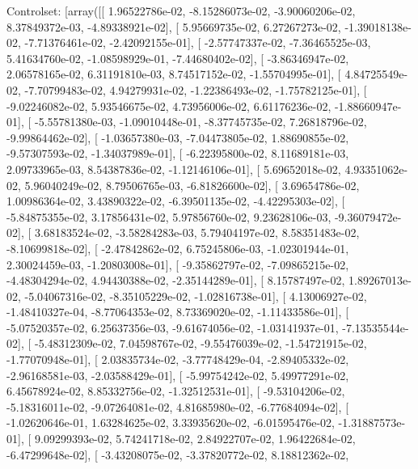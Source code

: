 \documentclass{article}
\begin{document}
Controlset: [array([[  1.96522786e-02,  -8.15286073e-02,  -3.90060206e-02,
          8.37849372e-03,  -4.89338921e-02],
       [  5.95669735e-02,   6.27267273e-02,  -1.39018138e-02,
         -7.71376461e-02,  -2.42092155e-01],
       [ -2.57747337e-02,  -7.36465525e-03,   5.41634760e-02,
         -1.08598929e-01,  -7.44680402e-02],
       [ -3.86346947e-02,   2.06578165e-02,   6.31191810e-03,
          8.74517152e-02,  -1.55704995e-01],
       [  4.84725549e-02,  -7.70799483e-02,   4.94279931e-02,
         -1.22386493e-02,  -1.75782125e-01],
       [ -9.02246082e-02,   5.93546675e-02,   4.73956006e-02,
          6.61176236e-02,  -1.88660947e-01],
       [ -5.55781380e-03,  -1.09010448e-01,  -8.37745735e-02,
          7.26818796e-02,  -9.99864462e-02],
       [ -1.03657380e-03,  -7.04473805e-02,   1.88690855e-02,
         -9.57307593e-02,  -1.34037989e-01],
       [ -6.22395800e-02,   8.11689181e-03,   2.09733965e-03,
          8.54387836e-02,  -1.12146106e-01],
       [  5.69652018e-02,   4.93351062e-02,   5.96040249e-02,
          8.79506765e-03,  -6.81826600e-02],
       [  3.69654786e-02,   1.00986364e-02,   3.43890322e-02,
         -6.39501135e-02,  -4.42295303e-02],
       [ -5.84875355e-02,   3.17856431e-02,   5.97856760e-02,
          9.23628106e-03,  -9.36079472e-02],
       [  3.68183524e-02,  -3.58284283e-03,   5.79404197e-02,
          8.58351483e-02,  -8.10699818e-02],
       [ -2.47842862e-02,   6.75245806e-03,  -1.02301944e-01,
          2.30024459e-03,  -1.20803008e-01],
       [ -9.35862797e-02,  -7.09865215e-02,  -4.48304294e-02,
          4.94430388e-02,  -2.35144289e-01],
       [  8.15787497e-02,   1.89267013e-02,  -5.04067316e-02,
         -8.35105229e-02,  -1.02816738e-01],
       [  4.13006927e-02,  -1.48410327e-04,  -8.77064353e-02,
          8.73369020e-02,  -1.11433586e-01],
       [ -5.07520357e-02,   6.25637356e-03,  -9.61674056e-02,
         -1.03141937e-01,  -7.13535544e-02],
       [ -5.48312309e-02,   7.04598767e-02,  -9.55476039e-02,
         -1.54721915e-02,  -1.77070948e-01],
       [  2.03835734e-02,  -3.77748429e-04,  -2.89405332e-02,
         -2.96168581e-03,  -2.03588429e-01],
       [ -5.99754242e-02,   5.49977291e-02,   6.45678924e-02,
          8.85332756e-02,  -1.32512531e-01],
       [ -9.53104206e-02,  -5.18316011e-02,  -9.07264081e-02,
          4.81685980e-02,  -6.77684094e-02],
       [ -1.02620646e-01,   1.63284625e-02,   3.33935620e-02,
         -6.01595476e-02,  -1.31887573e-01],
       [  9.09299393e-02,   5.74241718e-02,   2.84922707e-02,
          1.96422684e-02,  -6.47299648e-02],
       [ -3.43208075e-02,  -3.37820772e-02,   8.18812362e-02,
\end{document}
